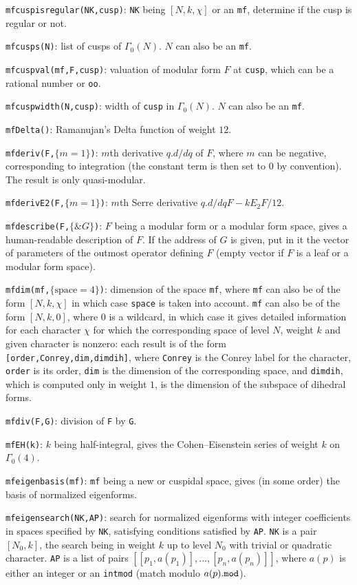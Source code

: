 \documentclass[11pt]{article}
\newcommand{\G}{\Gamma}
\def\kbd#1{{\tt #1}}
\begin{document}
\f\kbd{mfcuspisregular(NK,cusp)}: \kbd{NK} being $[N,k,\chi]$ or an \kbd{mf},
determine if the cusp is regular or not.

\f\kbd{mfcusps(N)}: list of cusps of $\G_0(N)$. $N$ can also be an \kbd{mf}.

\f\kbd{mfcuspval(mf,F,cusp)}: valuation of modular form $F$ at \kbd{cusp}, which
can be a rational number or \kbd{oo}.

\f\kbd{mfcuspwidth(N,cusp)}: width of \kbd{cusp} in $\G_0(N)$. $N$ can also be
an \kbd{mf}.

\f\kbd{mfDelta()}: Ramanujan's Delta function of weight $12$.

\f\kbd{mfderiv(F,$\{m=1\}$)}: $m$th derivative $q.d/dq$ of $F$, where
$m$ can be negative, corresponding to integration (the constant term
is then set to $0$ by convention). The result is only quasi-modular.

\f\kbd{mfderivE2(F,$\{m=1\}$)}: $m$th Serre derivative $q.d/dq F-kE_2F/12$.

\f\kbd{mfdescribe(F,$\{\&G\}$)}: $F$ being a modular form or a modular form
space, gives a human-readable description of $F$. If the address of $G$ is
given, put in it the vector of parameters of the outmost operator defining
$F$ (empty vector if $F$ is a leaf or a modular form space).

\f\kbd{mfdim(mf,$\{\text{space}=4\}$)}: dimension of the space \kbd{mf},
where \kbd{mf} can also be of the form $[N,k,\chi]$ in which case \kbd{space}
is taken into account. \kbd{mf} can also be of the form $[N,k,0]$, where $0$
is a wildcard, in which case it gives detailed information for each character
$\chi$ for which the corresponding space of level $N$, weight $k$ and given
character is nonzero: each result is of the form
\kbd{[order,Conrey,dim,dimdih]}, where \kbd{Conrey} is the Conrey label for
the character, \kbd{order} is its order, \kbd{dim} is the dimension of the
corresponding space, and \kbd{dimdih}, which is computed only in weight $1$,
is the dimension of the subspace of dihedral forms.

\f\kbd{mfdiv(F,G)}: division of \kbd{F} by \kbd{G}.

\f\kbd{mfEH(k)}: $k$ being half-integral, gives the Cohen--Eisenstein series
of weight $k$ on $\G_0(4)$.

\f\kbd{mfeigenbasis(mf)}: \kbd{mf} being a new or cuspidal space, gives
(in some order) the basis of normalized eigenforms.

\f\kbd{mfeigensearch(NK,AP)}: search for normalized eigenforms with
integer coefficients in spaces specified by \kbd{NK}, satisfying conditions
satisfied by \kbd{AP}. \kbd{NK} is a pair $[N_0,k]$, the search being in
weight $k$ up to level $N_0$ with trivial or quadratic character.
\kbd{AP} is a list of pairs $[[p_1,a(p_1)],...,[p_n,a(p_n)]]$, where $a(p)$
is either an integer or an \kbd{intmod} (match modulo $a(p)\kbd{.mod}$).
\end{document}
